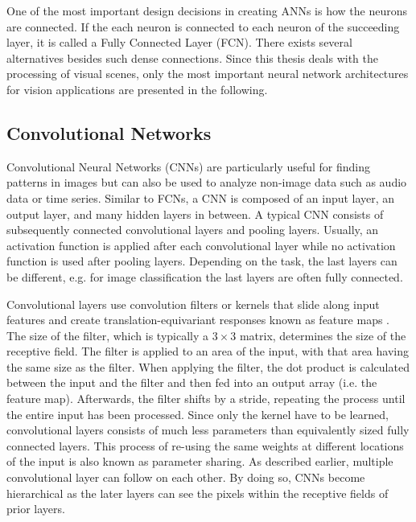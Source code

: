 One of the most important design decisions in creating ANNs is how the neurons are connected.
If the each neuron is connected to each neuron of the succeeding layer, it is called a Fully Connected Layer (FCN). 
There exists several alternatives besides such dense connections.
Since this thesis deals with the processing of visual scenes, only the most important neural network architectures for vision applications are presented in the following.

\subsection{Convolutional Networks}
Convolutional Neural Networks (CNNs) are particularly useful for finding patterns in images but can also be used to analyze non-image data such as audio data or time series.
Similar to FCNs, a CNN is composed of an input layer, an output layer, and many hidden layers in between.
A typical CNN consists of subsequently connected convolutional layers and pooling layers.
Usually, an activation function is applied after each convolutional layer while no activation function is used after pooling layers.
Depending on the task, the last layers can be different, e.g. for image classification the last layers are often fully connected.

Convolutional layers use convolution filters or kernels that slide along input features and create translation-equivariant responses known as feature maps .
The size of the filter, which is typically a \(3\times 3\) matrix, determines the size of the receptive field.
The filter is applied to an area of the input, with that area having the same size as the filter.
When applying the filter, the dot product is calculated between the input and the filter and then fed into an output array (i.e. the feature map).
Afterwards, the filter shifts by a stride, repeating the process until the entire input has been processed.
Since only the kernel have to be learned, convolutional layers consists of much less parameters than equivalently sized fully connected layers.
This process of re-using the same weights at different locations of the input is also known as parameter sharing.
As described earlier, multiple convolutional layer can follow on each other.
By doing so, CNNs become hierarchical as the later layers can see the pixels within the receptive fields of prior layers.


